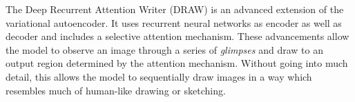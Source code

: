 The Deep Recurrent Attention Writer\cite{draw:2015} (DRAW) is an advanced extension of the variational autoencoder.
It uses recurrent neural networks as encoder as well as decoder and includes a selective attention mechanism.
These advancements allow the model to observe an image through a series of \emph{glimpses} and draw to an output region determined by the attention mechanism.
Without going into much detail, this allows the model to sequentially draw images in a way which resembles much of human-like drawing or sketching.



